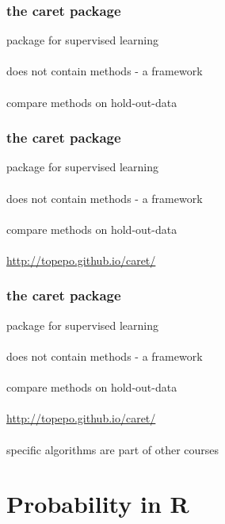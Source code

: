 \documentclass{beamer}
\begin{document}
\begin{frame}
	\frametitle{the caret package}
	\begin{center}
		package for supervised learning\\~\\
		does not contain methods - a framework\\~\\
		compare methods on hold-out-data
	\end{center}
\end{frame}

\begin{frame}
	\frametitle{the caret package}
	\begin{center}
		package for supervised learning\\~\\
		does not contain methods - a framework\\~\\
		compare methods on hold-out-data\\~\\
		\href{http://topepo.github.io/caret/}{http://topepo.github.io/caret/}
	\end{center}
\end{frame}

\begin{frame}
	\frametitle{the caret package}
	\begin{center}
		package for supervised learning\\~\\
		does not contain methods - a framework\\~\\
		compare methods on hold-out-data\\~\\
		\href{http://topepo.github.io/caret/}{http://topepo.github.io/caret/}\\~\\
		specific algorithms are part of other courses
	\end{center}
\end{frame}

\section{Probability in R}
\end{document}
